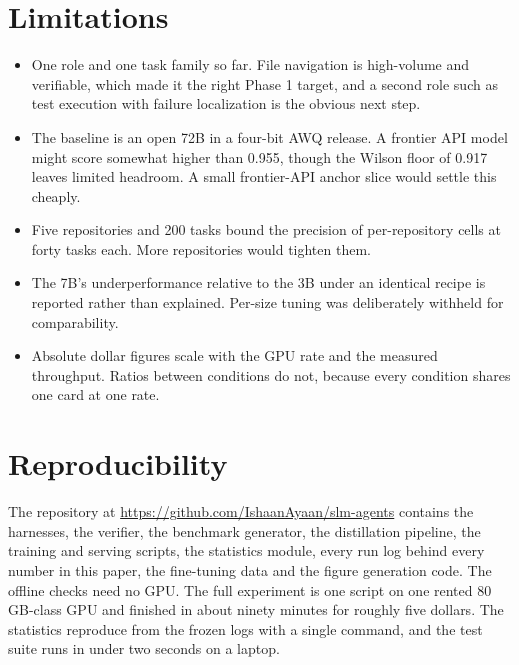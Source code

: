 \documentclass[11pt]{article}
\newcommand{\repo}{\url{https://github.com/IshaanAyaan/slm-agents}}
\begin{document}
\section{Limitations}

\begin{itemize}
  \item One role and one task family so far. File navigation is high-volume
        and verifiable, which made it the right Phase 1 target, and a second
        role such as test execution with failure localization is the obvious
        next step.
  \item The baseline is an open 72B in a four-bit AWQ release. A frontier API
        model might score somewhat higher than 0.955, though the Wilson floor
        of 0.917 leaves limited headroom. A small frontier-API anchor slice
        would settle this cheaply.
  \item Five repositories and 200 tasks bound the precision of per-repository
        cells at forty tasks each. More repositories would tighten them.
  \item The 7B's underperformance relative to the 3B under an identical
        recipe is reported rather than explained. Per-size tuning was
        deliberately withheld for comparability.
  \item Absolute dollar figures scale with the GPU rate and the measured
        throughput. Ratios between conditions do not, because every condition
        shares one card at one rate.
\end{itemize}

\section{Reproducibility}

The repository at \repo{} contains the harnesses, the verifier, the benchmark
generator, the distillation pipeline, the training and serving scripts, the
statistics module, every run log behind every number in this paper, the
fine-tuning data and the figure generation code. The offline checks need no
GPU. The full experiment is one script on one rented 80\,GB-class GPU and
finished in about ninety minutes for roughly five dollars. The statistics
reproduce from the frozen logs with a single command, and the test suite runs
in under two seconds on a laptop.

\end{document}
